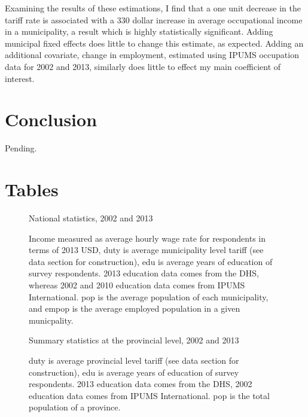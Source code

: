 \documentclass[12pt]{article}
\begin{document}
Examining the results of these estimations, I find that a one unit 
decrease in the tariff rate is associated with a 330 dollar increase 
in average occupational income in a municipality, a result which is
highly statistically significant. Adding municipal
fixed effects does little to change this estimate, as expected.
Adding an additional covariate, change in employment, estimated
using IPUMS occupation data for 2002 and 2013, similarly does
little to effect my main coefficient of interest.

\vspace{-10pt}
\section{Conclusion}
\label{sec:Conclusion}
Pending.

\newpage
\singlespacing



\bigskip \bigskip \bigskip
\appendix
\singlespacing

\section{Tables}
\label{sec:Tables}
\fontsize{10pt}{12pt}\selectfont

\begin{figure}[H]
\begin{center}
National statistics, 2002 and 2013

\caption{\label{fig:Summary 1}}
\end{center}
Income measured
as average hourly wage rate for respondents in terms of 2013 USD, 
duty is average municipality level tariff (see data
section for construction), edu is average years of education of survey respondents. 
2013 education data comes from the DHS, whereas 2002 and 2010 education data comes
from IPUMS International. pop is the average population of each municipality,
and empop is the average employed population in a given municpality.
\end{figure}

\begin{figure}[H]
\begin{center}
Summary statistics at the provincial level, 2002 and 2013

\caption{\label{fig:Summary 2}}
\end{center}
duty is average provincial level tariff (see data
section for construction), edu is average years of education of survey respondents. 
2013 education data comes from the DHS, 2002 education data comes
from IPUMS International. pop is the total population of a province.
\end{figure}
\end{document}
